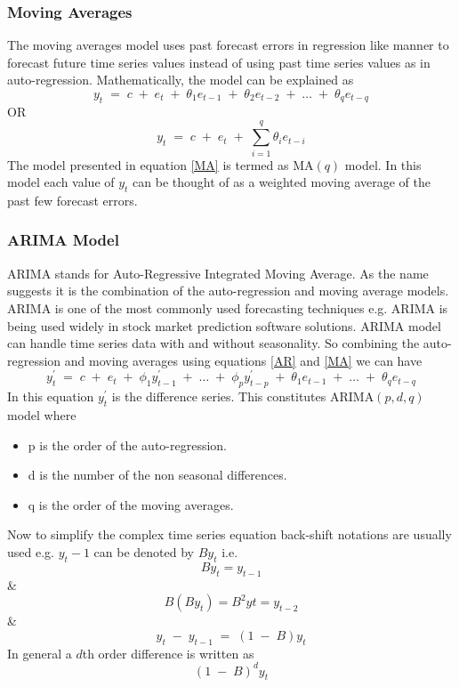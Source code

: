\subsubsection{Moving Averages}
 The moving averages model uses past forecast errors in regression like manner to forecast future time series values instead of using past time series values as in auto-regression. Mathematically, the model can be explained as
 \begin{equation}\label{MA}
 y_{t}\; =\;c\;+\;e_{t}\;+\;\theta_{1}e_{t-1}\;+\;\theta_{2}e_{t-2}\;+\;\dotsc\;+\;\theta_{q}e_{t-q}
\end{equation}
OR
$$
y_{t}\; =\;c\;+\;e_{t}\;+\;\sum\limits_{i=1}^q\theta_{i}e_{t-i}
$$
The model presented  in equation \ref{MA} is termed as MA\((q)\) model. In this model each value of \(y_t\) can be thought of as a weighted moving average of the past few forecast errors.
\subsubsection{ARIMA Model}
ARIMA stands for Auto-Regressive Integrated Moving Average. As the name suggests it is the combination of the auto-regression and moving average models. ARIMA is one of the most commonly used forecasting techniques e.g. ARIMA is being used widely in stock market prediction software solutions. ARIMA model can handle time series data with and without seasonality. So combining the auto-regression and moving averages using equations \ref{AR} and \ref{MA} we can have 
\begin{equation}\label{ARIMA1}
 y^\prime_{t}\; =\;c\;+\;e_{t}\;+\;\phi_{1}y^\prime_{t-1}\;+\;\dotsc\;+\;\phi_{p}y^\prime_{t-p}\;+\;\theta_{1}e_{t-1}\;+\;\dotsc\;+\;\theta_{q}e_{t-q}
\end{equation}
In this equation \(y^\prime_t\) is the difference series. This constitutes ARIMA\((p,d,q)\) model where
\begin{itemize}
\item p is the order of the auto-regression.
\item d is the number of the non seasonal differences.
\item q is the order of the moving averages.
\end{itemize}
Now to simplify the complex time series equation back-shift notations are usually used e.g. \(y_t-1\) can be denoted by \(By_t\) i.e.
$$By_{t} = y_{t-1}$$
\&
$$B(By_{t}) = B^2y{t} = y_{t-2}  $$
\& 
$$ y_{t}\; -\; y_{t-1}\;=\; (1\;-\;B)y_{t}  $$
In general a \(d\)th order difference is written as 
$$ (1\;-\;B)^d y_{t} $$

